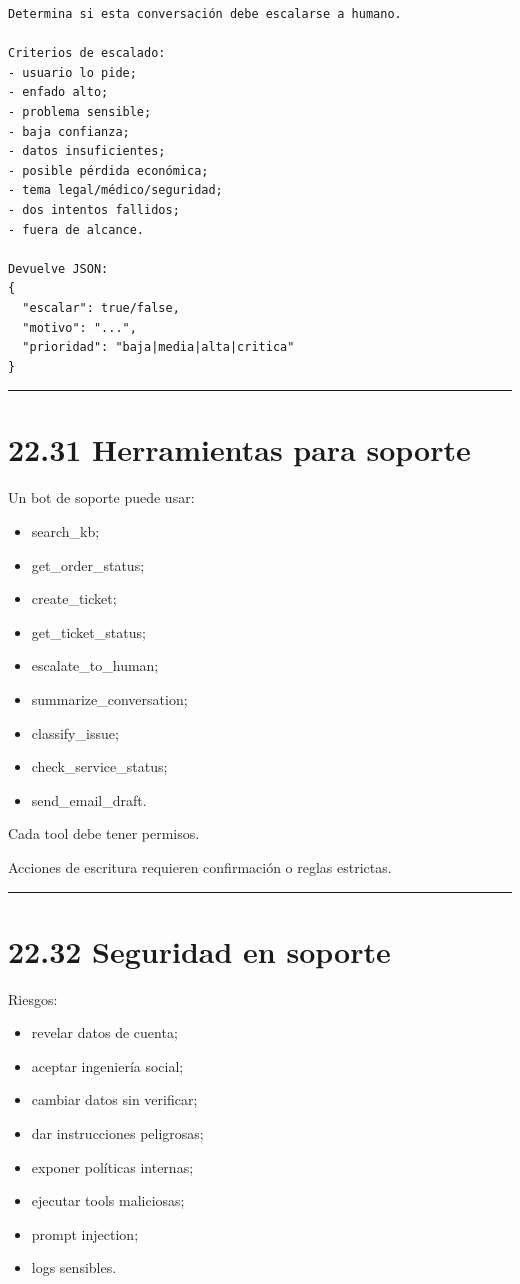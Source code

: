 \begin{lstlisting}
Determina si esta conversación debe escalarse a humano.

Criterios de escalado:
- usuario lo pide;
- enfado alto;
- problema sensible;
- baja confianza;
- datos insuficientes;
- posible pérdida económica;
- tema legal/médico/seguridad;
- dos intentos fallidos;
- fuera de alcance.

Devuelve JSON:
{
  "escalar": true/false,
  "motivo": "...",
  "prioridad": "baja|media|alta|critica"
}
\end{lstlisting}

\begin{center}\rule{0.5\linewidth}{0.5pt}\end{center}

\section{22.31 Herramientas para
soporte}\label{herramientas-para-soporte}

Un bot de soporte puede usar:

\begin{itemize}
\tightlist
\item
  search\_kb;
\item
  get\_order\_status;
\item
  create\_ticket;
\item
  get\_ticket\_status;
\item
  escalate\_to\_human;
\item
  summarize\_conversation;
\item
  classify\_issue;
\item
  check\_service\_status;
\item
  send\_email\_draft.
\end{itemize}

Cada tool debe tener permisos.

Acciones de escritura requieren confirmación o reglas estrictas.

\begin{center}\rule{0.5\linewidth}{0.5pt}\end{center}

\section{22.32 Seguridad en soporte}\label{seguridad-en-soporte}

Riesgos:

\begin{itemize}
\tightlist
\item
  revelar datos de cuenta;
\item
  aceptar ingeniería social;
\item
  cambiar datos sin verificar;
\item
  dar instrucciones peligrosas;
\item
  exponer políticas internas;
\item
  ejecutar tools maliciosas;
\item
  prompt injection;
\item
  logs sensibles.
\end{itemize}

